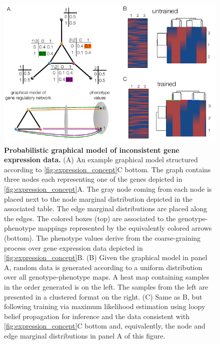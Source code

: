 \begin{figure}[!ht]
\centering
\noindent\includegraphics[width=0.9\columnwidth]{fig/inconsistentthreecycle.pdf}
\caption{{\bf Probabilistic graphical model of inconsistent gene expression data.} (A) An example graphical model structured according to \ref{fig:expression_concept}C bottom. The graph contains three nodes each representing one of the genes depicted in \ref{fig:expression_concept}A. The gray node coming from each node is placed next to the node marginal distribution depicted in the associated table. The edge marginal distributions are placed along the edges. The colored boxes (top) are associated to the genotype-phenotype mappings represented by the equivalently colored arrows (bottom). The phenotype values derive from the coarse-graining process over gene expression data depicted in \ref{fig:expression_concept}B. (B) Given the graphical model in panel A, random data is generated according to a uniform distribution over all genotype-phenotype maps. A heat map containing samples in the order generated is on the left. The samples from the left are presented in a clustered format on the right. (C) Same as B, but following training via maximum likelihood estimation using loopy belief propagation for inference and the data consistent with \ref{fig:expression_concept}C bottom and, equivalently, the node and edge marginal distributions in panel A of this figure.}
\label{fig:inconsistentthreecycle}
\end{figure}

